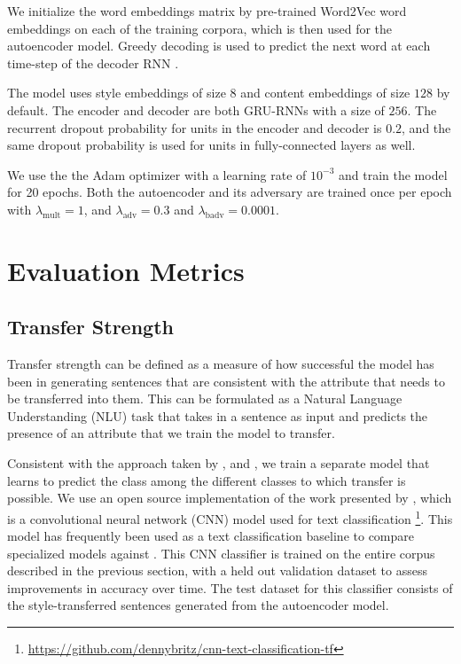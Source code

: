 We initialize the word embeddings matrix by pre-trained Word2Vec word embeddings \citep{mikolov2013efficient,mikolov2013distributed,mikolov2013linguistic} on each of the training corpora, which is then used for the autoencoder model. Greedy decoding  is used to predict the next word at each time-step of the decoder RNN \citep{germann2003greedy}.

The model uses style embeddings of size $8$ and content embeddings of size $128$ by default. The encoder and decoder are both GRU-RNNs with a size of $256$. The recurrent dropout probability for units in the encoder and decoder is $0.2$, and the same dropout probability is used for units in fully-connected layers as well.

We use the the Adam optimizer \citep{kingma2014adam} with a learning rate of $10^{-3}$ and train the model for 20 epochs. Both the autoencoder and its adversary are trained once per epoch with $\lambda_\text{mult} = 1$, and $\lambda_\text{adv} = 0.3$ and $\lambda_\text{badv} = 0.0001$.


\section{Evaluation Metrics} \label{sec:evaluation-metrics}

\subsection{Transfer Strength}

Transfer strength can be defined as a measure of how successful the model has been in generating sentences that are consistent with the attribute that needs to be transferred into them. This can be formulated as a Natural Language Understanding (NLU) task that takes in a sentence as input and predicts the presence of an attribute that we train the model to transfer.

Consistent with the approach taken by \cite{hu2017toward}, \cite{shen2017style} and \cite{fu2017style}, we train a separate model that learns to predict the class among the different classes to which transfer is possible. We use an open source implementation of the work presented by \cite{kim2014convolutional}, which is a convolutional neural network (CNN) model used for text classification \footnote{\url{https://github.com/dennybritz/cnn-text-classification-tf}}. This model has frequently been used as a text classification baseline to compare specialized models against \citep{tai2015improved} \citep{kiros2015skip} \citep{zhang2015character}. This CNN classifier is trained on the entire corpus described in the previous section, with a held out validation dataset to assess improvements in accuracy over time. The test dataset for this classifier consists of the style-transferred sentences generated from the autoencoder model.

